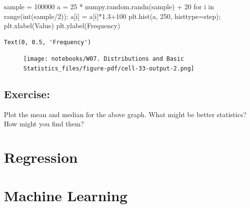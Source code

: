 \documentclass[
  letterpaper,
  DIV=11,
  numbers=noendperiod]{scrreprt}
\newenvironment{Shaded}{\begin{snugshade}}{\end{snugshade}}
\newcommand{\BuiltInTok}[1]{\textcolor[rgb]{0.00,0.23,0.31}{#1}}
\newcommand{\ControlFlowTok}[1]{\textcolor[rgb]{0.00,0.23,0.31}{#1}}
\newcommand{\DecValTok}[1]{\textcolor[rgb]{0.68,0.00,0.00}{#1}}
\newcommand{\FloatTok}[1]{\textcolor[rgb]{0.68,0.00,0.00}{#1}}
\newcommand{\KeywordTok}[1]{\textcolor[rgb]{0.00,0.23,0.31}{#1}}
\newcommand{\NormalTok}[1]{\textcolor[rgb]{0.00,0.23,0.31}{#1}}
\newcommand{\OperatorTok}[1]{\textcolor[rgb]{0.37,0.37,0.37}{#1}}
\newcommand{\StringTok}[1]{\textcolor[rgb]{0.13,0.47,0.30}{#1}}
\begin{document}
\begin{Shaded}
\begin{Highlighting}[]
\NormalTok{sample }\OperatorTok{=} \DecValTok{100000}
\NormalTok{a }\OperatorTok{=} \DecValTok{25} \OperatorTok{*}\NormalTok{ numpy.random.randn(sample) }\OperatorTok{+} \DecValTok{20}
\ControlFlowTok{for}\NormalTok{ i }\KeywordTok{in} \BuiltInTok{range}\NormalTok{(}\BuiltInTok{int}\NormalTok{(sample}\OperatorTok{/}\DecValTok{2}\NormalTok{)):}
\NormalTok{    a[i] }\OperatorTok{=}\NormalTok{ a[i]}\OperatorTok{*}\FloatTok{1.3}\OperatorTok{+}\DecValTok{100}
\NormalTok{plt.hist(a, }\DecValTok{250}\NormalTok{, histtype}\OperatorTok{=}\StringTok{\textquotesingle{}step\textquotesingle{}}\NormalTok{)}\OperatorTok{;}
\NormalTok{plt.xlabel(}\StringTok{\textquotesingle{}Value\textquotesingle{}}\NormalTok{)}
\NormalTok{plt.ylabel(}\StringTok{\textquotesingle{}Frequency\textquotesingle{}}\NormalTok{)}
\end{Highlighting}
\end{Shaded}

\begin{verbatim}
Text(0, 0.5, 'Frequency')
\end{verbatim}

\begin{figure}[H]

{\centering \texttt{[image: notebooks/W07. Distributions and Basic Statistics\_files/figure-pdf/cell-33-output-2.png]}

}

\end{figure}

\hypertarget{exercise-20}{%
\section{Exercise:}\label{exercise-20}}

Plot the mean and median for the above graph. What might be better
statistics? How might you find them?


\hypertarget{regression}{%
\chapter{Regression}\label{regression}}


\hypertarget{machine-learning}{%
\chapter{Machine Learning}\label{machine-learning}}
\end{document}
